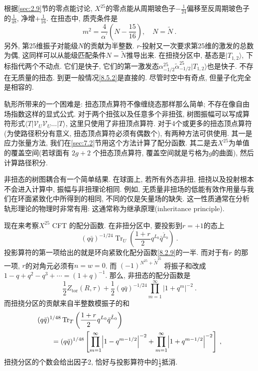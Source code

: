 根据\ref{sec:2.9}节的零点能讨论, $X^{25}$的零点能从周期玻色子$-\frac{1}{24}$偏移至反周期玻色子的$\frac{1}{48}$, 净增$+\frac{1}{16}$. 
在扭态中, 质壳条件是
\begin{equation}
	m^{2}=\frac{4}{\alpha^{\prime}}\left(N-\frac{15}{16}\right), \quad N=\tilde{N} \:. \label{8.5.8}
\end{equation}
另外, 第25维振子对能级$N$的贡献为半整数.  $r$-投射又一次要求第25维的激发的总数为偶, 这同样可以从能级匹配条件$N=\tilde{N}$推导出来. 
在扭挠分区中, 基态是$|T_{1,2}\rangle$, 下标指代两个不动点. 它们是快子, 
它们的第一激发态$\alpha_{-1/2}^{25} \tilde{\alpha}_{-1/2}^{25}|T_{1,2}\rangle$也是快子. 不存在无质量的扭态. 
到更一般情况\eqref{8.5.2}是直接的. 尽管时空中有奇点, 但量子化完全是相容的.

轨形所带来的一个困难是: 扭态顶点算符不像缠绕态那样那么简单; 不存在像自由场指数这样的显式公式. 对于两个扭弦以及任意多个非扭弦, 
树图振幅可以写成算符形式$\langle T|\mathscr{V}_{U} \mathscr{V}_{U} \ldots|T\rangle$, 这里只使用了非扭顶点算符. 
对于4个或更多的扭态顶点算符(为使路径积分有意义, 扭态顶点算符必须有偶数个), 有两种方法可供使用. 
其一是应力张量方法, 我们在\ref{sec:7.2}节用这个方法计算了配分函数. 其二是去$X^{25}$为单值的覆盖空间(若球面有 $2g+2$ 个扭态顶点算符, 
覆盖空间就是亏格为$g$的曲面), 然后计算路径积分.

非扭态的树图耦合有一个简单结果. 在球面上, 若所有外态非扭, 扭挠以及投射根本不会进入计算中, 振幅与非扭理论相同. 
例如, 无质量非扭场的低能有效作用量与我们在环面紧致化中所得到的相同, 不同的仅是矢量场的缺失. 
这一性质通常在分析轨形理论的物理时非常有用: 这通常称为继承原理(inheritance principle).

现在来考察$X^{25}$ CFT 的配分函数. 在非扭分区中, 要投影到$r=+1$的态上
\begin{equation}
	(q \bar{q})^{-1 / 24} \operatorname{Tr}_{U}\left(\frac{1+r}{2} q^{L_{0}} \bar{q}^{\tilde{L}_{0}}\right) \:. \label{8.5.9}
\end{equation}
投影算符的第一项给出的就是环向紧致化配分函数\eqref{8.2.9}的一半. 而对于有$r$ 的那一项, $r$的对角元必须有$n=w=0$. 
而 $(-1)^{N^{25}+\tilde{N}^{25}}$ 将振子和改成 $1-q+q^{2}-q^{3}+\cdots=(1+q)^{-1}$. 那么, 非扭态的配分函数是
\begin{equation}
	\frac{1}{2} Z_{\mathrm{tor}}(R, \tau)+\frac{1}{2}(q \bar{q})^{-1/24} \prod_{m=1}^{\infty}|1+q^{m}|^{-2} \:. \label{8.5.10}
\end{equation}
而扭挠分区的贡献来自半整数模振子的和
\begin{align}
	&(q \bar{q})^{1/48} \operatorname{Tr}_{T}\left(\frac{1+r}{2} q^{L_{0}} \bar{q}^{\tilde{L}_{0}}\right) \nonumber \\
	&\qquad =(q \bar{q})^{1/48}\left[\prod_{m=1}^{\infty}\Bigl|1-q^{m-1/2}\Bigr|^{-2} + 
	\prod_{m=1}^{\infty}\Bigl|1+q^{m-1/2}\Bigr|^{-2}\right] \:, \label{8.5.11}
\end{align}
扭挠分区的个数会给出因子2, 恰好与投影算符中的$\frac{1}{2}$抵消. 

